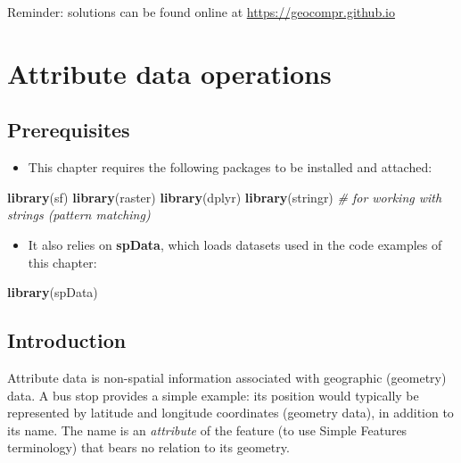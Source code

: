 \documentclass[]{krantz}
\newenvironment{Shaded}{\begin{snugshade}}{\end{snugshade}}
\newcommand{\CommentTok}[1]{\textcolor[rgb]{0.37,0.37,0.37}{\textit{#1}}}
\newcommand{\KeywordTok}[1]{\textcolor[rgb]{0.27,0.27,0.27}{\textbf{#1}}}
\newcommand{\NormalTok}[1]{#1}
\providecommand{\tightlist}{%
  \setlength{\itemsep}{0pt}\setlength{\parskip}{0pt}}
\begin{document}
Reminder: solutions can be found online at \url{https://geocompr.github.io}

\hypertarget{attr}{%
\section{Attribute data operations}\label{attr}}

\hypertarget{prerequisites-1}{%
\subsection*{Prerequisites}\label{prerequisites-1}}

\begin{itemize}
\tightlist
\item
  This chapter requires the following packages to be installed and attached:
\end{itemize}

\begin{Shaded}
\begin{Highlighting}[]
\KeywordTok{library}\NormalTok{(sf)}
\KeywordTok{library}\NormalTok{(raster)}
\KeywordTok{library}\NormalTok{(dplyr)}
\KeywordTok{library}\NormalTok{(stringr) }\CommentTok{# for working with strings (pattern matching)}
\end{Highlighting}
\end{Shaded}

\begin{itemize}
\tightlist
\item
  It also relies on \textbf{spData}, which loads datasets used in the code examples of this chapter:
\end{itemize}

\begin{Shaded}
\begin{Highlighting}[]
\KeywordTok{library}\NormalTok{(spData)}
\end{Highlighting}
\end{Shaded}

\hypertarget{introduction}{%
\subsection{Introduction}\label{introduction}}

Attribute data is non-spatial information associated with geographic (geometry) data.
A bus stop provides a simple example: its position would typically be represented by latitude and longitude coordinates (geometry data), in addition to its name.
The name is an \emph{attribute} of the feature (to use Simple Features terminology) that bears no relation to its geometry.
\end{document}
